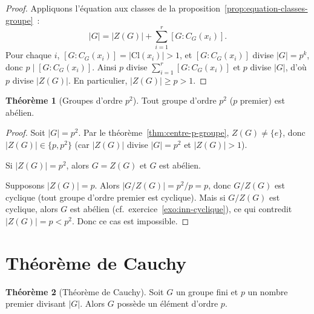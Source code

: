 \documentclass[12pt,a4paper,openany]{book}
\theoremstyle{definition}
\newtheorem{theoreme}{Théorème}[chapter]
\begin{document}
\begin{proof}
  Appliquons l'équation aux classes de la
  proposition~\ref{prop:equation-classes-groupe}~:
  \[
    |G| = |Z(G)| + \sum_{i=1}^{r}[G:C_G(x_i)].
  \]
  Pour chaque $i$, $[G:C_G(x_i)] = |\mathrm{Cl}(x_i)|>1$, et
  $[G:C_G(x_i)]$ divise $|G|=p^k$, donc $p\mid [G:C_G(x_i)]$.
  Ainsi $p$ divise $\sum_{i=1}^{r}[G:C_G(x_i)]$ et $p$ divise $|G|$,
  d'où $p$ divise $|Z(G)|$. En particulier, $|Z(G)|\geq p > 1$.
\end{proof}

\begin{theoreme}[Groupes d'ordre $p^2$]\label{thm:ordre-p2}
  Tout groupe d'ordre $p^2$ ($p$ premier) est abélien.
\end{theoreme}

\begin{proof}
  Soit $|G|=p^2$. Par le théorème~\ref{thm:centre-p-groupe},
  $Z(G)\neq\{e\}$, donc $|Z(G)|\in\{p,p^2\}$ (car $|Z(G)|$ divise
  $|G|=p^2$ et $|Z(G)|>1$).

  Si $|Z(G)|=p^2$, alors $G = Z(G)$ et $G$ est abélien.

  Supposons $|Z(G)|=p$. Alors $|G/Z(G)| = p^2/p = p$, donc $G/Z(G)$
  est cyclique (tout groupe d'ordre premier est cyclique). Mais si
  $G/Z(G)$ est cyclique, alors $G$ est abélien (cf.\
  exercice~\ref{exo:inn-cyclique}), ce qui contredit $|Z(G)|=p<p^2$.
  Donc ce cas est impossible.
\end{proof}

\section{Théorème de Cauchy}\label{sec:cauchy}

\begin{theoreme}[Théorème de Cauchy]\label{thm:cauchy}
  Soit $G$ un groupe fini et $p$ un nombre premier divisant $|G|$.
  Alors $G$ possède un élément d'ordre $p$.
\end{theoreme}
\end{document}
